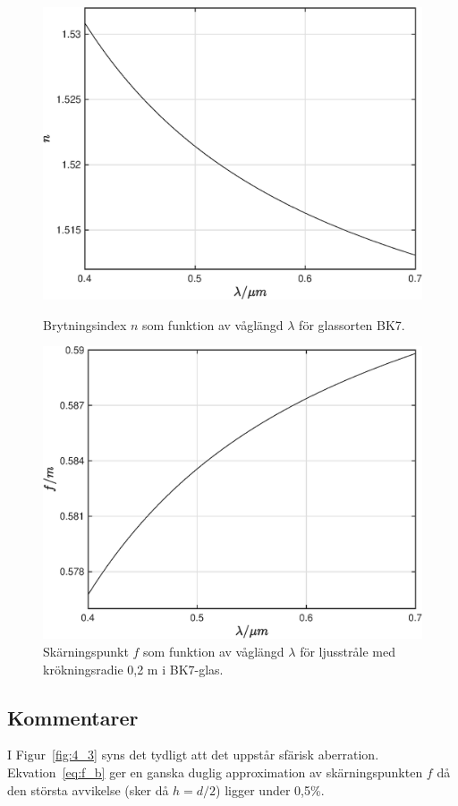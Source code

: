 \begin{figure}[H]
        \includegraphics[width=\linewidth]{Resources/Graphics/fig4_4.eps}
        \caption{Brytningsindex $n$ som funktion av våglängd $\lambda$ för glassorten BK7.}\label{fig:4_4}
    \endminipage\hfill
        \includegraphics[width=\linewidth]{Resources/Graphics/fig4_5.eps}
        \caption{Skärningspunkt $f$ som funktion av våglängd $\lambda$ för ljusstråle med krökningsradie 0,2 m i BK7-glas.}\label{fig:4_5}
    \endminipage
\end{figure}

\subsection*{Kommentarer}
I Figur~\ref{fig:4_3} syns det tydligt att det uppstår sfärisk aberration. Ekvation~\ref{eq:f_b} ger en ganska duglig approximation av skärningspunkten $f$ då den största avvikelse (sker då $h = d/2$) ligger under 0,5\%.
\vspace{3mm}

